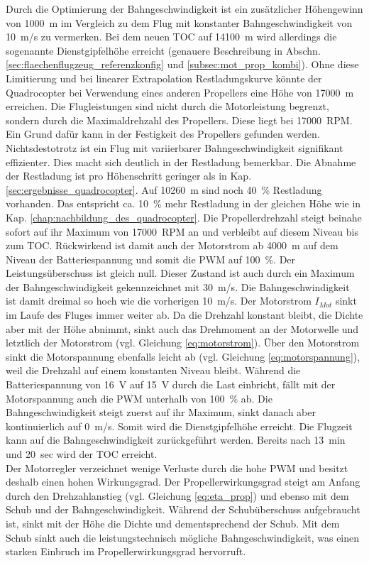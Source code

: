 Durch die Optimierung der Bahngeschwindigkeit ist ein zusätzlicher Höhengewinn von \SI{1000}{m} im Vergleich zu dem Flug mit konstanter Bahngeschwindigkeit von \SI{10}{m/s} zu vermerken. Bei dem neuen TOC auf \SI{14100}{m} wird allerdings die sogenannte Dienstgipfelhöhe erreicht (genauere Beschreibung in Abschn. \ref{sec:flaechenflugzeug_referenzkonfig} und \ref{subsec:mot_prop_kombi}). Ohne diese Limitierung und bei linearer Extrapolation Restladungskurve könnte der Quadrocopter bei Verwendung eines anderen Propellers eine Höhe von \SI{17000}{m} erreichen. Die Flugleistungen sind nicht durch die Motorleistung begrenzt, sondern durch die Maximaldrehzahl des Propellers. Diese liegt bei \SI{17000}{RPM}. Ein Grund dafür kann in der Festigkeit des Propellers gefunden werden. Nichtsdestotrotz ist ein Flug mit variierbarer Bahngeschwindigkeit signifikant effizienter. Dies macht sich deutlich in der Restladung bemerkbar. Die Abnahme der Restladung ist pro Höhenschritt geringer als in Kap. \ref{sec:ergebnisse_quadrocopter}. Auf \SI{10260}{m} sind noch \SI{40}{\%} Restladung vorhanden. Das entspricht ca. \SI{10}{\%} mehr Restladung in der gleichen Höhe wie in Kap. \ref{chap:nachbildung_des_quadrocopter}. Die Propellerdrehzahl steigt beinahe sofort auf ihr Maximum von \SI{17000}{RPM} an und verbleibt auf diesem Niveau bis zum TOC. Rückwirkend ist damit auch der Motorstrom ab \SI{4000}{m} auf dem Niveau der Batteriespannung und somit die PWM auf \SI{100}{\%}. Der Leistungsüberschuss ist gleich null. Dieser Zustand ist auch durch ein Maximum der Bahngeschwindigkeit gekennzeichnet mit \SI{30}{m/s}. Die Bahngeschwindigkeit ist damit dreimal so hoch wie die vorherigen \SI{10}{m/s}. Der Motorstrom \ensuremath{I_{Mot}} sinkt im Laufe des Fluges immer weiter ab. Da die Drehzahl konstant bleibt, die Dichte aber mit der Höhe abnimmt, sinkt auch das Drehmoment an der Motorwelle und letztlich der Motorstrom (vgl. Gleichung \eqref{eq:motorstrom}). Über den Motorstrom sinkt die Motorspannung ebenfalls leicht ab (vgl. Gleichung \eqref{eq:motorspannung}), weil die Drehzahl auf einem konstanten Niveau bleibt. Während die Batteriespannung von \SI{16}{V} auf \SI{15}{V} durch die Last einbricht, fällt mit der Motorspannung auch die PWM unterhalb von \SI{100}{\%} ab. Die Bahngeschwindigkeit steigt zuerst auf ihr Maximum, sinkt danach aber kontinuierlich auf \SI{0}{m/s}. Somit wird die Dienstgipfelhöhe erreicht. Die Flugzeit kann auf die Bahngeschwindigkeit zurückgeführt werden. Bereits nach \SI{13}{min} und \SI{20}{sec} wird der TOC erreicht. \\
Der Motorregler verzeichnet wenige Verluste durch die hohe PWM und besitzt deshalb einen hohen Wirkungsgrad. Der Propellerwirkungsgrad steigt am Anfang durch den Drehzahlanstieg (vgl. Gleichung \eqref{eq:eta_prop}) und ebenso mit dem Schub und der Bahngeschwindigkeit. Während der Schubüberschuss aufgebraucht ist, sinkt mit der Höhe die Dichte und dementsprechend der Schub. Mit dem Schub sinkt auch die leistungstechnisch mögliche Bahngeschwindigkeit, was einen starken Einbruch im Propellerwirkungsgrad hervorruft.

